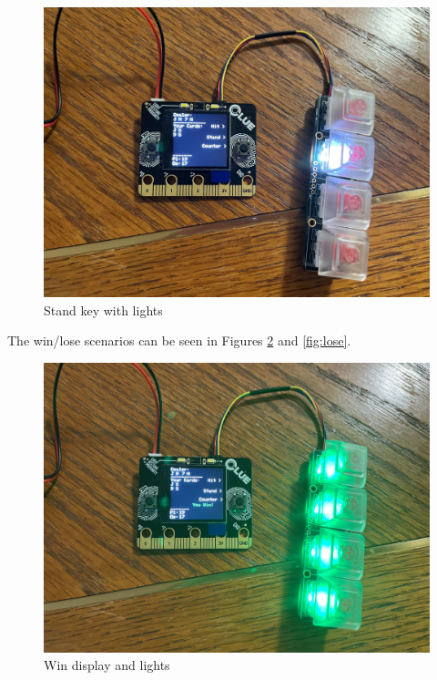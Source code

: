 \documentclass[12pt]{article}
\begin{document}
\begin{figure}[ht]
  \centering
  \includegraphics[width=6in]{stand.jpg}
  \caption{Stand key with lights}
  \label{fig:stand}
  \end{figure}

The win/lose scenarios can be seen in Figures \ref{fig:win} and \ref{fig:lose}.
\begin{figure}[ht]
  \centering
  \includegraphics[width=6in]{win.jpg}
  \caption{Win display and lights}
  \label{fig:win}
  \end{figure}
\end{document}
